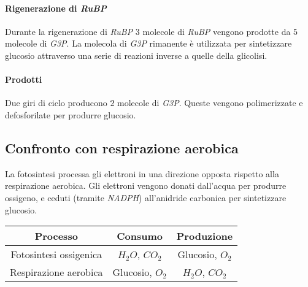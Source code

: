 			\paragraph{Rigenerazione di \emph{RuBP}}
			Durante la rigenerazione di \emph{RuBP} $3$ molecole di \emph{RuBP} vengono prodotte da $5$ molecole di \emph{G3P}. 
			La molecola di \emph{G3P} rimanente \`e utilizzata per sintetizzare glucosio attraverso una serie di reazioni inverse a quelle della glicolisi.
	
			\paragraph{Prodotti}
			Due giri di ciclo producono $2$ molecole di \emph{G3P}. 
			Queste vengono polimerizzate e defosforilate per produrre glucosio. 

	\subsection{Confronto con respirazione aerobica}
	La fotosintesi processa gli elettroni in una direzione opposta rispetto alla respirazione aerobica. 
	Gli elettroni vengono donati dall'acqua per produrre ossigeno, e ceduti (tramite \emph{NADPH}) all'anidride carbonica per sintetizzare glucosio.
	\begin{center}
		\begin{tabular}{|c|c|c|}
			\hline
			Processo & Consumo & Produzione \\
			\hline
			Fotosintesi ossigenica & \emph{$H_2O$}, \emph{$CO_2$} & Glucosio, \emph{$O_2$}\\
			\hline
			Respirazione aerobica & Glucosio, \emph{$O_2$} & \emph{$H_2O$}, \emph{$CO_2$}\\
			\hline
		\end{tabular}
	\end{center}
